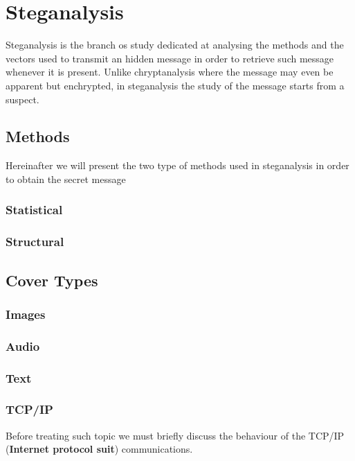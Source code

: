 \documentclass[../../main.tex]{subfiles}
\begin{document}
    
    \section{Steganalysis}
    Steganalysis is the branch os study dedicated at analysing the methods and the vectors used to transmit an hidden message in order to retrieve such message whenever it is present.
    Unlike chryptanalysis where the message may even be apparent but enchrypted, in steganalysis the study of the message starts from a suspect.
    \subsection{Methods}
    Hereinafter we will present the two type of methods used in steganalysis in order to obtain the secret message 

    \subsubsection{Statistical}

    \subsubsection{Structural}
    

    \subsection{Cover Types}

    \subsubsection{Images}


    \subsubsection{Audio}
    
    
    \subsubsection{Text}
    
    
    \subsubsection{TCP/IP}
    Before treating such topic we must briefly discuss the behaviour of the TCP/IP (\textbf{Internet protocol suit}) communications.
    
\end{document}
